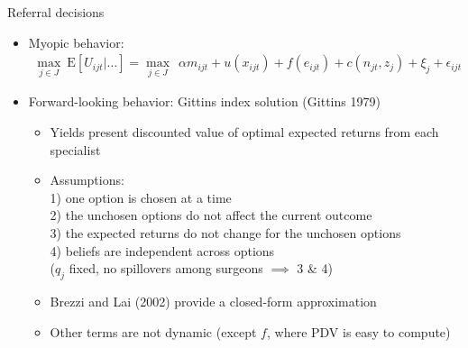 \documentclass[slides, aspectratio=169]{beamer}
\newcommand{\bit}{\begin{itemize}}
\newcommand{\eit}{\end{itemize}}
\begin{document}
\begin{frame}{Referral decisions}
\begin{itemize}

\item Myopic behavior:
    \begin{align*}
        \max_{j \in J} \ \text{E} \left[ U_{ijt} | \dots \right] =
        \max_{j \in J} \ \ \alpha m_{ijt} + u(x_{ijt}) + f(e_{ijt}) + c(n_{jt}, z_j) + \xi_j + \epsilon_{ijt}
    \end{align*}
\smallskip \pause 

\item Forward-looking behavior: Gittins index solution (Gittins 1979) 
\bit
    \item Yields present discounted value of optimal expected returns from each specialist
    \item Assumptions: \\ 
    1) one option is chosen at a time \\
    2) the unchosen options do not affect the current outcome \\
    3) the expected returns do not change for the unchosen options \\
    4) beliefs are independent across options \\
    ($q_j$ fixed, no spillovers among surgeons $\implies$ 3 \& 4)
    \item Brezzi and Lai (2002) provide a closed-form approximation
    \item Other terms are not dynamic (except $f$, where PDV is easy to compute) 
\eit

\end{itemize}
\end{frame}
\end{document}
